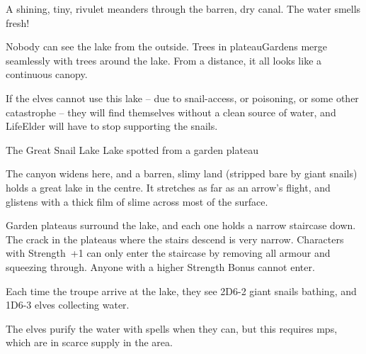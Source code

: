 \begin{boxtext}
  A shining, tiny, rivulet meanders through the barren, dry canal.
  The water smells fresh!
\end{boxtext}

Nobody can see the lake from the outside.
Trees in \gls{plateauGardens} merge seamlessly with trees around the lake.
From a distance, it all looks like a continuous canopy.

If the elves cannot use this lake -- due to snail-access, or poisoning, or some other catastrophe -- they will find themselves without a clean source of water, and \gls{LifeElder} will have to stop supporting the snails.

{The Great Snail Lake}%
{Lake spotted from a garden plateau}%

The canyon widens here, and a barren, slimy land (stripped bare by giant snails) holds a great lake in the centre.
It stretches as far as an arrow's flight, and glistens with a thick film of slime across most of the surface.

Garden plateaus surround the lake, and each one holds a narrow staircase down.
The crack in the plateaus where the stairs descend is very narrow.
Characters with Strength~+1 can only enter the staircase by removing all armour and squeezing through.
Anyone with a higher Strength Bonus cannot enter.

Each time the troupe arrive at the lake,
they see 2D6-2 giant snails bathing, and 1D6-3 elves collecting water.

The elves purify the water with spells when they can, but this requires \glspl{mp}, which are in scarce supply in the area.

